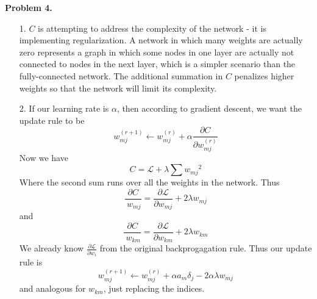 \documentclass[12pt]{amsart}
\theoremstyle{remark}
\begin{document}
\noindent \textbf{Problem 4.}

\begin{itemize}

\item[1.]
$C$ is attempting to address the complexity of the network - it is implementing regularization. A network in which many weights are actually zero represents a graph in which some nodes in one layer are actually not connected to nodes in the next layer, which is a simpler scenario than the fully-connected network. The additional summation in $C$ penalizes higher weights so that the network will limit its complexity.

\item[2.]
If our learning rate is $\alpha$, then according to gradient descent, we want the update rule to be 
\[
w_{mj}^{(r+1)} \leftarrow w_{mj}^{(r)} + \alpha \frac{\partial C}{\partial w_{mj}^{(r)}}
\]
Now we have
\[
C=\mathcal{L}+\lambda \sum {w_{mj}}^2
\]
Where the second sum runs over all the weights in the network.
Thus
\[
\frac{\partial C}{\ w_{mj}} = \frac{\partial \mathcal{L}}{\partial w_{mj}}+2\lambda w_{mj}
\]
and 
\[
\frac{\partial C}{\ w_{km}} = \frac{\partial \mathcal{L}}{\partial w_{km}}+2\lambda w_{km}
\]
We already know $\frac{\partial \mathcal{L}}{\partial w_i}$ from the original backprogagation rule. Thus our update rule is
\[
w_{mj}^{(r+1)} \leftarrow w_{mj}^{(r)}+\alpha a_{m}\delta_j-2\alpha\lambda w_{mj}
\]
and analogous for $w_{km}$, just replacing the indices. 
\end{itemize}
\end{document}
